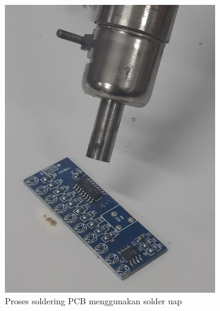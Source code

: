 \begin{figure}[H]
  \centering
  \begin{subfigure}[c]{0.4\linewidth}
    \centering
    \includegraphics[width=\linewidth]{img/modul_2/percobaan2_soldering.jpg}
    \caption{Proses soldering PCB menggunakan solder uap \label{fig:inisub1}}
  \end{subfigure}
  \hspace{1cm}
  \begin{subfigure}[c]{0.4\linewidth}
    \centering

\end{subfigure}
\end{figure}

